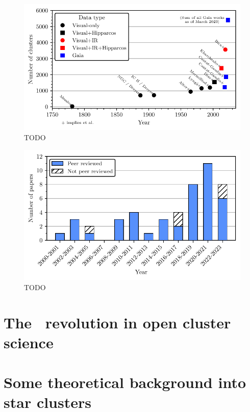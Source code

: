 \begin{figure}[htb]
	\includegraphics[width=\textwidth]{fig/c1/catalogues.pdf}
	\caption{TODO}
	\label{fig:intro::history:catalogues}
\end{figure}


\begin{figure}[htb]
	\includegraphics[width=\textwidth]{fig/c1/papers.pdf}
	\caption{TODO}
	\label{fig:intro:history:papers}
\end{figure}


\section{The \gaia\ revolution in open cluster science}


\section{Some theoretical background into star clusters}


